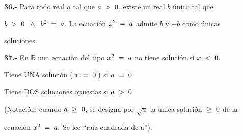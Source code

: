 \documentclass[12pt]{article}
\begin{document}
\textbf{36.-} Para todo real $a$ tal que $a\hspace{0.1cm}>\hspace{0.1cm}0$, existe un real $b$ único tal que \par $b\hspace{0.1cm}>\hspace{0.1cm}0\hspace{0.2cm}\wedge\hspace{0.2cm} b^{2}\hspace{0.1cm} =\hspace{0.1cm} a.$ \hspace{0.1cm} La ecuación $x^{2} \hspace{0.1cm} = \hspace{0.1cm}a$ admite $b$ y $-b$ como únicas \par soluciones.\vspace{0.2cm}

\textbf{37.-} En $\mathbb{R}$ una ecuación del tipo $x^{2}\hspace{0.1cm}=\hspace{0.1cm}a$ no tiene solución si $x \hspace{0.1cm}< \hspace{0.1cm} 0.$ 

Tiene UNA solución $(\hspace{0.1cm}x\hspace{0.1cm}=\hspace{0.1cm}0\hspace{0.1cm})$ si $a\hspace{0.1cm}=\hspace{0.1cm}0$ \vspace{0.1cm}

Tiene DOS soluciones opuestas si $a\hspace{0.1cm}>\hspace{0.1cm}0$\vspace{0.1cm}

(Notación: cuando $a\hspace{0.1cm}\geq \hspace{0.1cm} 0$, se designa por $\sqrt{a}$ la única solución $\hspace{0.1cm} \geq \hspace{0.1cm} 0$ de la \par ecuación $x^{2}\hspace{0.1cm}=\hspace{0.1cm}a.$ Se lee ``raíz cuadrada de a'').\vspace{0.2cm}
\end{document}
